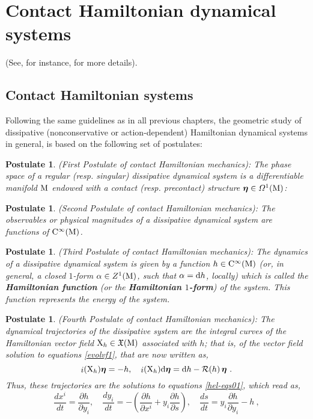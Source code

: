 \documentclass[12pt]{report}
\newtheorem{pos}[teor]{Postulate}
\def\beq{\begin{equation}}
\def\eeq{\end{equation}}
\def\dst{\displaystyle}
\def\vf{\mathfrak X}
\def\df{{\mit\Omega}}
\def\d{{\rm d}}
\def\bmeta{\mbox{\boldmath $\eta$}}
\def\X{{\rm X}}
\def\inn{\mathop{i}\nolimits}
\def\Cinfty{{\rm C}^\infty}
\newcommand{\Reeb}{\mathcal{R}}
\begin{document}
\section{Contact Hamiltonian dynamical systems}
\label{chs}


(See, for instance, \cite{BCT-2017,CIAGLIA2018,DeLeon2019,GGMRR-2019b,Go-69,LL-2018}  for more details).


\subsection{Contact Hamiltonian systems}
\label{nasposcon}


Following the same guidelines as in all previous chapters,
the geometric study of dissipative (nonconservative or action-dependent) Hamiltonian dynamical systems
in general, is based on the following set of postulates:

\begin{pos}
{\rm (First Postulate of contact Hamiltonian mechanics\/)}:
The phase space of a regular (resp. singular)
dissipative dynamical system 
is a differentiable manifold ${\rm M}$ endowed with a contact 
(resp. precontact) structure $\bmeta\in\df^1({\rm M})$:
\label{axicon1}
\end{pos}

\begin{pos}
{\rm (Second Postulate of contact Hamiltonian mechanics\/)}:
The observables or physical magnitudes of a  dissipative dynamical system
are functions of $\Cinfty ({\rm M})$.
\label{axicon2}
\end{pos}

\begin{pos}
{\rm (Third Postulate of contact Hamiltonian mechanics\/)}:
The dynamics of a dissipative dynamical system
is given by a function $h\in\Cinfty({\rm M})$
(or, in general, a closed $1$-form $\alpha \in Z^1({\rm M})$, such that $\alpha=\d h$, locally)
which is called the {\sl \textbf{Hamiltonian function}}
(or  the {\sl \textbf{Hamiltonian $1$-form}}\/) of the system.
This function represents the energy of the system.
\label{axicon3}
\end{pos}

\begin{pos}
{\rm (Fourth Postulate of contact Hamiltonian mechanics\/)}:
The dynamical trajectories of the dissipative system are the integral curves
of the Hamiltonian vector field $\X_h\in\vf({\rm M})$ associated with $h$;
that is, of the vector field solution to equations \eqref{evolvf1}, that are now written as,
\beq
\inn(\X_h)\bmeta=-h ,\quad
\inn(\X_h)\d\bmeta = \d h-\Reeb(h)\,\bmeta\ .
\label{evolvf111}
\eeq
Thus, these trajectories are the solutions to equations \eqref{hel-eqs01}, which read as,
\beq
\label{hel-eqs011}
\dst\frac{dx^i}{dt} = \frac{\partial h}{\partial y_i},\quad
\dst\frac{dy_i}{dt} = -\left(\frac{\partial h}{\partial x^i} + y_i\frac{\partial h}{\partial s}\right),\quad
\dst\frac{ds}{dt} = y_i\frac{\partial h}{\partial y_i} - h \ , 
\eeq
\label{axicon4}
\end{pos}
\end{document}
